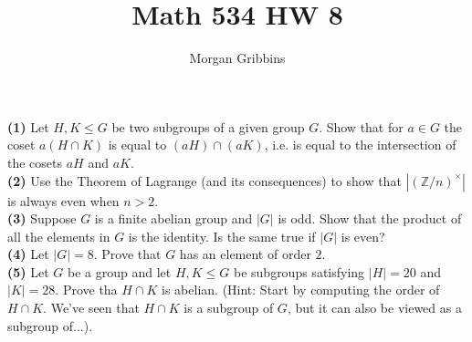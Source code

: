\documentclass[12pt,letterpaper]{article}
\title{Math 534 HW 8}
\author{Morgan Gribbins}
\date{}
\begin{document}
	
\maketitle

\textbf{(1)} Let \(H, K \leq G\) be two subgroups of a given group \(G\). Show that for \(a \in G\) the coset \(a(H \cap K)\) is equal to \((aH)\cap (aK)\), i.e. is equal to the intersection of the cosets \(aH\) and \(aK\). \\



\textbf{(2)} Use the Theorem of Lagrange (and its consequences) to show that \(|(\mathbb{Z}/n)^{\times}|\) is always even when \(n > 2\). \\



\textbf{(3)} Suppose \(G\) is a finite abelian group and \(|G|\) is odd. Show that the product of all the elements in \(G\) is the identity. Is the same true if \(|G|\) is even? \\



\textbf{(4)} Let \(|G| = 8\). Prove that \(G\) has an element of order \(2\). \\



\textbf{(5)} Let \(G\) be a group and let \(H, K \leq G\) be subgroups satisfying \(|H| = 20\) and \(|K| = 28\). Prove tha \(H \cap K\) is abelian. (Hint: Start by computing the order of \(H \cap K\). We've seen that \(H \cap K\) is a subgroup of \(G\), but it can also be viewed as a subgroup of...). \\
\end{document}
